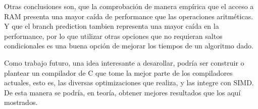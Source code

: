 \documentclass[a4paper]{article}
\begin{document}
Otras conclusiones son, que la comprobación de manera empírica que el acceso a RAM presenta una mayor caída de performance que las operaciones aritméticas. Y que el branch prediction tambien representa una mayor caída en la performance, por lo que utilizar otras opciones que no requieran saltos condicionales es una buena opción de mejorar los tiempos de un algoritmo dado.

Como trabajo futuro, una idea interesante a desarollar, podría ser construir o plantear un compilador de C que tome la mejor parte de los compiladores actuales, esto es, las diversas optimizaciones que realiza, y las integre con SIMD. De esta manera se podría, en teoría, obtener mejores resultados que los aquí mostrados.
\end{document}

